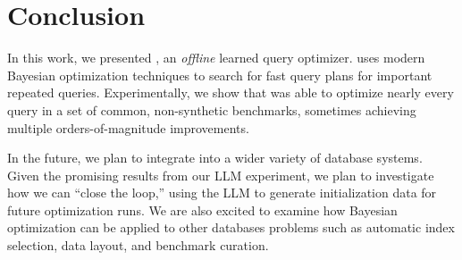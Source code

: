 \section{Conclusion}
In this work, we presented \sysname, an \emph{offline} learned query optimizer. \sysname uses modern Bayesian optimization techniques to search for fast query plans for important repeated queries. Experimentally, we show that \sysname was able to optimize nearly every query in a set of common, non-synthetic benchmarks, sometimes achieving multiple orders-of-magnitude improvements.

In the future, we plan to integrate \sysname into a wider variety of database systems. Given the promising results from our LLM experiment, we plan to investigate how we can ``close the loop,'' using the LLM to generate initialization data for future optimization runs. We are also excited to examine how Bayesian optimization can be applied to other databases problems such as automatic index selection, data layout, and benchmark curation.